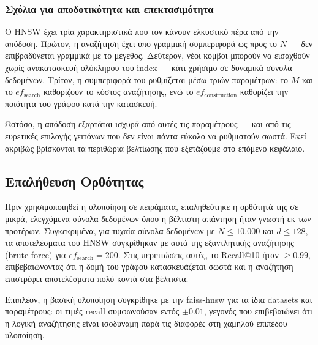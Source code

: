 \documentclass[12pt,a4paper]{article}
\begin{document}
\subsubsection{Σχόλια για αποδοτικότητα και επεκτασιμότητα}
Ο HNSW έχει τρία χαρακτηριστικά που τον κάνουν ελκυστικό πέρα από την απόδοση. Πρώτον, η αναζήτηση έχει υπο-γραμμική συμπεριφορά ως προς το $N$ --- δεν επιβραδύνεται γραμμικά με το μέγεθος. Δεύτερον, νέοι κόμβοι μπορούν να εισαχθούν χωρίς ανακατασκευή ολόκληρου του index --- κάτι χρήσιμο σε δυναμικά σύνολα δεδομένων. Τρίτον, η συμπεριφορά του ρυθμίζεται μέσω τριών παραμέτρων: το $M$ και το $ef_{\text{search}}$ καθορίζουν το κόστος αναζήτησης, ενώ το $ef_{\text{construction}}$ καθορίζει την ποιότητα του γράφου κατά την κατασκευή.

Ωστόσο, η απόδοση εξαρτάται ισχυρά από αυτές τις παραμέτρους --- και από τις ευρετικές επιλογής γειτόνων που δεν είναι πάντα εύκολο να ρυθμιστούν σωστά. Εκεί ακριβώς βρίσκονται τα περιθώρια βελτίωσης που εξετάζουμε στο επόμενο κεφάλαιο. 


\subsection{Επαλήθευση Ορθότητας}

Πριν χρησιμοποιηθεί η υλοποίηση σε πειράματα, επαληθεύτηκε η ορθότητά της σε μικρά, ελεγχόμενα σύνολα δεδομένων όπου η βέλτιστη απάντηση ήταν γνωστή εκ των προτέρων. Συγκεκριμένα, για τυχαία σύνολα δεδομένων με $N \leq 10.000$ και $d \leq 128$, τα αποτελέσματα του HNSW συγκρίθηκαν με αυτά της εξαντλητικής αναζήτησης (brute-force) για $ef_{\text{search}} = 200$. Στις περιπτώσεις αυτές, το Recall@10 ήταν $\geq 0.99$, επιβεβαιώνοντας ότι η δομή του γράφου κατασκευάζεται σωστά και η αναζήτηση επιστρέφει αποτελέσματα πολύ κοντά στα βέλτιστα.

Επιπλέον, η βασική υλοποίηση συγκρίθηκε με την faiss-hnsw για τα ίδια datasets και παραμέτρους: οι τιμές recall συμφωνούσαν εντός $\pm 0.01$, γεγονός που επιβεβαιώνει ότι η λογική αναζήτησης είναι ισοδύναμη παρά τις διαφορές στη χαμηλού επιπέδου υλοποίηση.

\newpage
\end{document}
